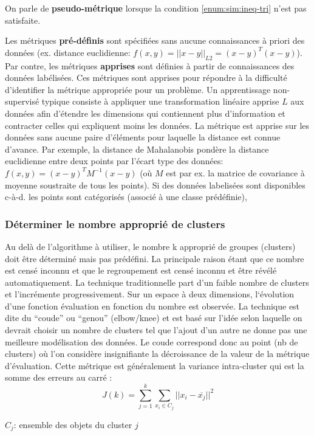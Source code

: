 On parle de \textbf{pseudo-métrique} lorsque la condition \ref{enum:sim:ineq-tri} n'est pas satisfaite.

Les métriques \textbf{pré-définis} sont spécifiées sans aucune connaissances à priori des données (ex. distance euclidienne: $f(x,y) = \vert\vert x - y \vert\vert_{L2} = (x-y)^T(x-y)$). Par contre, les métriques \textbf{apprises} sont définies à partir de connaissances des données labélisées. Ces métriques sont apprises pour répondre à la difficulté d'identifier la métrique appropriée pour un problème. Un apprentissage non-supervisé typique consiste à appliquer une transformation linéaire apprise $L$ aux données afin d'étendre les dimensions qui contiennent plus d'information et contracter celles qui expliquent moins les données. La métrique est apprise sur les données sans aucune paire d'éléments pour laquelle la distance est connue d'avance. Par exemple, la distance de Mahalanobis pondère la distance euclidienne entre deux points par l'écart type des données: $f(x,y) = (x-y)^T M^{-1}(x-y)$ (où $M$ est par ex. la matrice de covariance à moyenne soustraite de tous les points). Si des données labelisées sont disponibles c-à-d. les points sont catégorisés (associé à une classe prédéfinie), 


\subsubsection{Déterminer le nombre approprié de clusters}
    Au delà de l’algorithme à utiliser, le nombre k approprié de groupes (clusters) doit être déterminé mais pas prédéfini. La principale raison étant que ce nombre est censé inconnu et que le regroupement est censé inconnu et être révélé automatiquement.
La technique traditionnelle part d’un faible nombre de clusters et l’incrémente progressivement. Sur un espace à deux dimensions,  l‘évolution d’une fonction évaluation en fonction du nombre est observée.  La technique est dite du “coude” ou “genou” (elbow/knee) et est basé sur l’idée selon laquelle on devrait choisir un nombre de clusters tel que l’ajout d’un autre ne donne pas une meilleure modélisation des données. Le coude correspond donc au point (nb de clusters) où l’on considère insignifiante la décroissance de la valeur de la métrique d’évaluation. Cette métrique est généralement la variance intra-cluster qui est la somme des erreurs au carré  :
\[J(k) = \sum\limits_{j=1}^k\sum\limits_{x_i \in C_j}\vert\vert x_i-\overline{x_j}\vert\vert^2\]

$C_j$: ensemble des objets du cluster $j$

